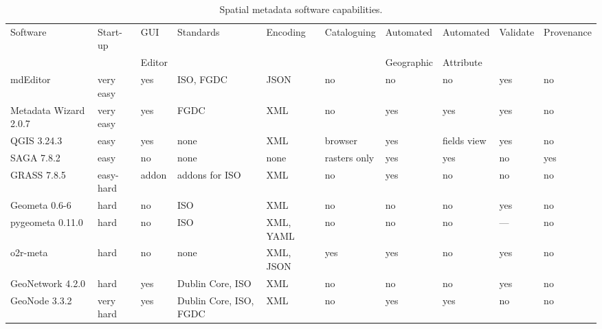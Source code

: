 \documentclass{isprs} %
\begin{document}
\begin{table*}[ht!]
    \centering
    \begin{tabular}{p{1.3cm}p{1.3cm}p{1.1cm}p{1.3cm}p{1.3cm}p{1.3cm}p{1.3cm}p{1.3cm}p{1.2cm}p{1.3cm}}
    \hline
         Software     & Start-up & GUI  & Standards & Encoding & Cataloguing & Automated   & Automated & Validate  & Provenance  \\
                                &          &  Editor &        &        &     & Geographic  & Attribute &           &               \\ [1mm]
        \hline
        mdEditor                & very easy & yes & ISO, FGDC & JSON                & no            & no    & no    & yes & no  \\ [0.5cm]
        Metadata Wizard 2.0.7   & very easy & yes & FGDC    & XML                  & no            & yes   & yes   & yes & no  \\ [0.5cm]
        QGIS 3.24.3             & easy      & yes & none         & XML             & browser       & yes   & fields view & yes & no  \\ [0.5cm]
        SAGA 7.8.2              & easy      & no & none          & none            & rasters only  & yes   & yes & no & yes  \\ [0.5cm]
        GRASS 7.8.5             & easy-hard & addon & addons for ISO  & XML          & no            & yes   & no    & no & no \\ [0.5cm]
        Geometa 0.6-6           & hard      & no & ISO  & XML                     & no            & no    & no & yes & no  \\ [0.5cm]
        pygeometa 0.11.0        & hard      & no & ISO  & XML, YAML                     & no            & no    & no & --- & no  \\ [0.5cm]
        o2r-meta                & hard      & no & none & XML, JSON                     & yes           & yes   & no & yes & no  \\ [0.5cm]
        GeoNetwork 4.2.0        & hard      & yes & Dublin Core, ISO & XML         & no            & no    & no & yes & no \\ [0.5cm]
        GeoNode 3.3.2           & very hard & yes & Dublin Core, ISO, FGDC & XML    & no            & yes   & yes & no & no  \\ 
        \hline
    \end{tabular}
\caption{Spatial metadata software capabilities.}
\label{tab:Metadata_Software}
\end{table*}
\end{document}

